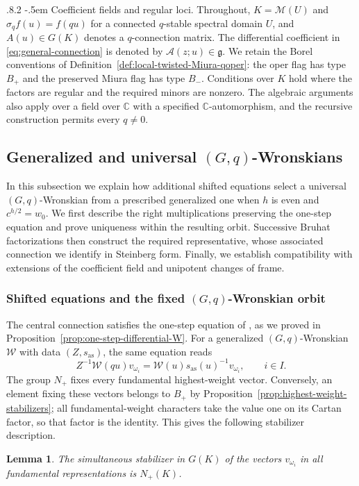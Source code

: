 \documentclass[11pt,leqno]{amsart}
\makeatletter
\numberwithin{equation}{section}
\renewcommand\paragraph{\@startsection{paragraph}{4}{\z@}%
  {.8\baselineskip \@plus .2\baselineskip}%
  {-.5em}%
  {\normalfont\normalsize\bfseries}}
\theoremstyle{plain}
\newtheorem{lemma}[theorem]{Lemma}
\theoremstyle{definition}
\theoremstyle{plain}
\theoremstyle{definition}
\theoremstyle{remark}
\newcommand{\g}{\mathfrak g}
\makeatother
\begin{document}
\paragraph{Coefficient fields and regular loci.}
Throughout, $K=\mathcal M(U)$ and $\sigma_qf(u)=f(qu)$ for a connected $q$-stable spectral domain $U$, and $A(u)\in G(K)$ denotes a $q$-connection matrix.  The differential coefficient in \eqref{eq:general-connection} is denoted by $\mathscr A(z;u)\in\g$.  We retain the Borel conventions of Definition~\ref{def:local-twisted-Miura-qoper}: the oper flag has type $B_+$ and the preserved Miura flag has type $B_-$.  Conditions over $K$ hold where the factors are regular and the required minors are nonzero.  The algebraic arguments also apply over a field over $\mathbb C$ with a specified $\mathbb C$-automorphism, and the recursive construction permits every $q\ne0$.

\subsection{Generalized and universal \texorpdfstring{$(G,q)$}{(G,q)}-Wronskians}\label{sec:generalized-universal-Wronskians}
In this subsection we explain how additional shifted equations select a universal $(G,q)$-Wronskian from a prescribed generalized one when $h$ is even and $c^{h/2}=w_0$.  We first describe the right multiplications preserving the one-step equation and prove uniqueness within the resulting orbit.  Successive Bruhat factorizations then construct the required representative, whose associated connection we identify in Steinberg form.  Finally, we establish compatibility with extensions of the coefficient field and unipotent changes of frame.

\subsubsection{Shifted equations and the fixed \texorpdfstring{$(G,q)$}{(G,q)}-Wronskian orbit}
The central connection satisfies the one-step equation of \cite[Section~4]{KZ2021}, as we proved in Proposition~\ref{prop:one-step-differential-W}.  For a generalized $(G,q)$-Wronskian $\mathscr W$ with data $(Z,s_{\mathrm{as}})$, the same equation reads
\begin{equation}\label{eq:W-basic-u}
 Z^{-1}\mathscr W(qu)v_{\omega_i}
 =\mathscr W(u)s_{\mathrm{as}}(u)^{-1}v_{\omega_i},
 \qquad i\in I.
\end{equation}
The group $N_+$ fixes every fundamental highest-weight vector.  Conversely, an element fixing these vectors belongs to $B_+$ by Proposition~\ref{prop:highest-weight-stabilizers}; all fundamental-weight characters take the value one on its Cartan factor, so that factor is the identity.  This gives the following stabilizer description.
\begin{lemma}\label{lem:unipotent-weight-scalar}
The simultaneous stabilizer in $G(K)$ of the vectors $v_{\omega_i}$ in all fundamental representations is $N_+(K)$.
\end{lemma}
\end{document}
